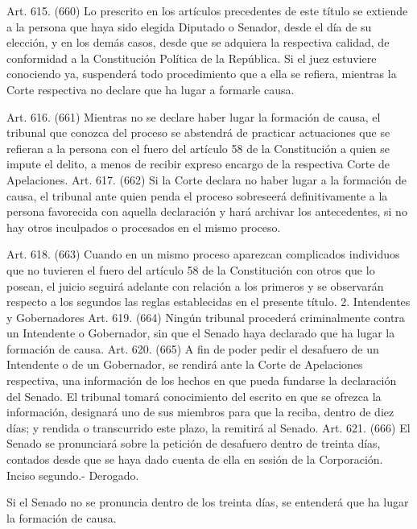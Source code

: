     Art. 615. (660) Lo prescrito en los artículos precedentes de este título se extiende a la persona que haya sido elegida Diputado o Senador, desde el día de su elección, y en los demás casos, desde que se adquiera la respectiva calidad, de conformidad a la Constitución Política de la República.
    Si el juez estuviere conociendo ya, suspenderá todo procedimiento que a ella se refiera, mientras la Corte respectiva no declare que ha lugar a formarle causa.

    Art. 616. (661) Mientras no se declare haber lugar la formación de causa, el tribunal que conozca del proceso se abstendrá de practicar actuaciones que se refieran a la persona con el fuero del artículo 58 de la Constitución a quien se impute el delito, a menos de recibir expreso encargo de la respectiva Corte de Apelaciones.
    Art. 617. (662) Si la Corte declara no haber lugar a la formación de causa, el tribunal ante quien penda el proceso sobreseerá definitivamente a la persona favorecida con aquella declaración y hará archivar los antecedentes, si no hay otros inculpados o procesados en el mismo proceso.


    Art. 618. (663) Cuando en un mismo proceso aparezcan complicados individuos que no tuvieren el fuero del artículo 58 de la Constitución con otros que lo posean, el juicio seguirá adelante con relación a los primeros y se observarán respecto a los segundos las reglas establecidas en el presente título.
    2. Intendentes y Gobernadores
    Art. 619. (664) Ningún tribunal procederá criminalmente contra un Intendente o Gobernador, sin que el Senado haya declarado que ha lugar la formación de causa.
    Art. 620. (665) A fin de poder pedir el desafuero de un Intendente o de un Gobernador, se rendirá ante la Corte de Apelaciones respectiva, una información de los hechos en que pueda fundarse la declaración del Senado.
    El tribunal tomará conocimiento del escrito en que se ofrezca la información, designará uno de sus miembros para que la reciba, dentro de diez días; y rendida o transcurrido este plazo, la remitirá al Senado.
    Art. 621. (666) El Senado se pronunciará sobre la petición de desafuero dentro de treinta días, contados desde que se haya dado cuenta de ella en sesión de la Corporación.
    Inciso segundo.- Derogado.

    Si el Senado no se pronuncia dentro de los treinta días, se entenderá que ha lugar la formación de causa.

